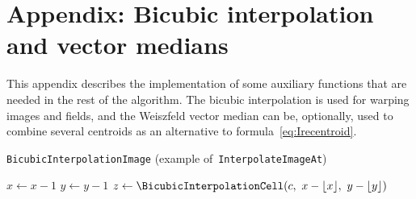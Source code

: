 \documentclass{ipol}
\begin{document}
%

\clearpage

\section*{Appendix: Bicubic interpolation and vector medians}

This appendix describes the implementation of some auxiliary functions that
are needed in the rest of the algorithm.  The bicubic interpolation is used
for warping images and fields, and the Weiszfeld vector median can be,
optionally, used to combine several centroids as an alternative to
formula~\ref{eq:Irecentroid}.

\begin{algorithm}[hp]
	\caption{\texttt{BicubicInterpolationImage} (example
	of~\texttt{InterpolateImageAt})}
	\label{alg:bicubicinterpolationimage}
	\dontprintsemicolon

	\BlankLine
	$x\leftarrow x-1$\;
	$y\leftarrow y-1$\;
	$z\leftarrow\BicubicInterpolationCell(c,\ x-\lfloor x\rfloor,\ y-\lfloor
	y\rfloor)$\;
\end{algorithm}
\end{document}
